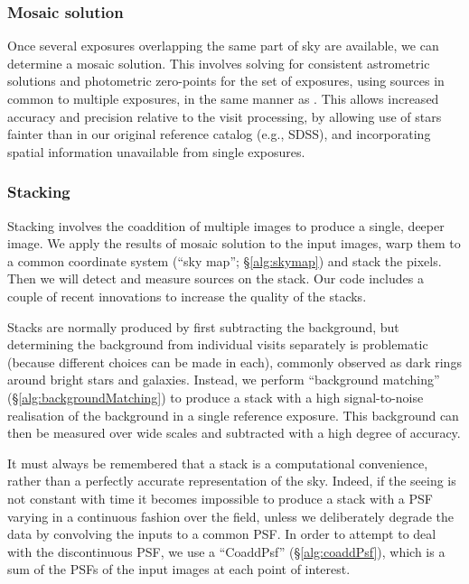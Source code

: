\documentclass[12pt]{article}
\begin{document}
\subsubsection{Mosaic solution}

Once several exposures overlapping the same part of sky are available, we can determine a mosaic solution.
This involves solving for consistent astrometric solutions and photometric zero-points for the set of
exposures, using sources in common to multiple exposures, in the same manner as \citet{2008ApJ...674.1217P}.
This allows increased accuracy and precision relative to the visit processing, by allowing use of stars
fainter than in our original reference catalog (e.g., SDSS), and incorporating spatial information unavailable
from single exposures.


\subsubsection{Stacking}

Stacking involves the coaddition of multiple images to produce a single, deeper image.  We apply the results
of mosaic solution to the input images, warp them to a common coordinate system (``sky map'';
\S\ref{alg:skymap}) and stack the pixels.  Then we will detect and measure sources on the stack.  Our code
includes a couple of recent innovations to increase the quality of the stacks.

Stacks are normally produced by first subtracting the background, but determining the background from
individual visits separately is problematic (because different choices can be made in each), commonly observed
as dark rings around bright stars and galaxies.  Instead, we perform ``background matching''
(\S\ref{alg:backgroundMatching}) to produce a stack with a high signal-to-noise realisation of the background
in a single reference exposure.  This background can then be measured over wide scales and subtracted with a
high degree of accuracy.

It must always be remembered that a stack is a computational convenience, rather than a perfectly accurate
representation of the sky.  Indeed, if the seeing is not constant with time it becomes impossible to produce a
stack with a PSF varying in a continuous fashion over the field, unless we deliberately degrade the data by
convolving the inputs to a common PSF.  In order to attempt to deal with the discontinuous PSF, we use a
``CoaddPsf'' (\S\ref{alg:coaddPsf}), which is a sum of the PSFs of the input images at each point of interest.
\end{document}
